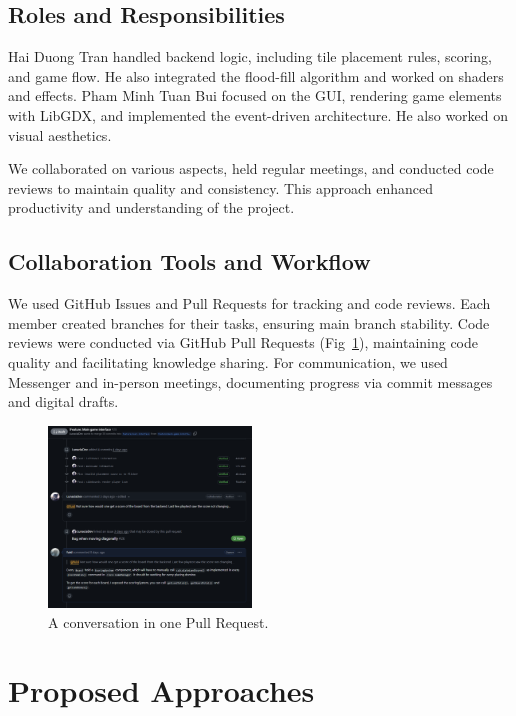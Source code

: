 \documentclass[conference]{IEEEtran}
\begin{document}
\subsection{Roles and Responsibilities}
Hai Duong Tran handled backend logic, including tile placement rules, scoring, and game flow. He also integrated the flood-fill algorithm and worked on shaders and effects. Pham Minh Tuan Bui focused on the GUI, rendering game elements with LibGDX, and implemented the event-driven architecture. He also worked on visual aesthetics.

We collaborated on various aspects, held regular meetings, and conducted code reviews to maintain quality and consistency. This approach enhanced productivity and understanding of the project.

\subsection{Collaboration Tools and Workflow}
We used GitHub Issues and Pull Requests for tracking and code reviews. Each member created branches for their tasks, ensuring main branch stability. Code reviews were conducted via GitHub Pull Requests (Fig~\ref{fig:github-pr}), maintaining code quality and facilitating knowledge sharing. For communication, we used Messenger and in-person meetings, documenting progress via commit messages and digital drafts.

\begin{figure}[htbp]
    \centerline{\includegraphics[width=0.48\textwidth]{assets/github-pr.png}}
    \caption{A conversation in one Pull Request.}\label{fig:github-pr}
\end{figure}

\section{Proposed Approaches}
\end{document}
